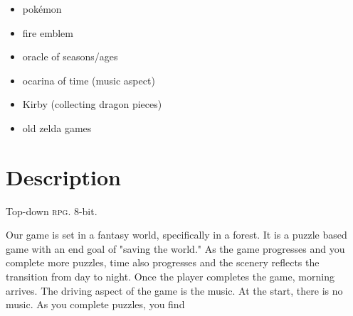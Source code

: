\documentclass{article}
\begin{document}
\begin{itemize}
\item pok\'emon
\item fire emblem
\item oracle of seasons\slash ages
\item ocarina of time (music aspect)
\item Kirby (collecting dragon pieces)
\item old zelda games
\end{itemize}

\section{Description}
\label{sec:description}

Top-down \textsc{rpg}.
8-bit.

Our game is set in a fantasy world, specifically in a forest.
It is a puzzle based game with an end goal of "saving the world."
As the game progresses and you complete more puzzles, time also
progresses and the scenery reflects the transition from day to night.
Once the player completes the game, morning arrives.
The driving aspect of the game is the music. At the start, there is
no music. As you complete puzzles, you find   
\end{document}
